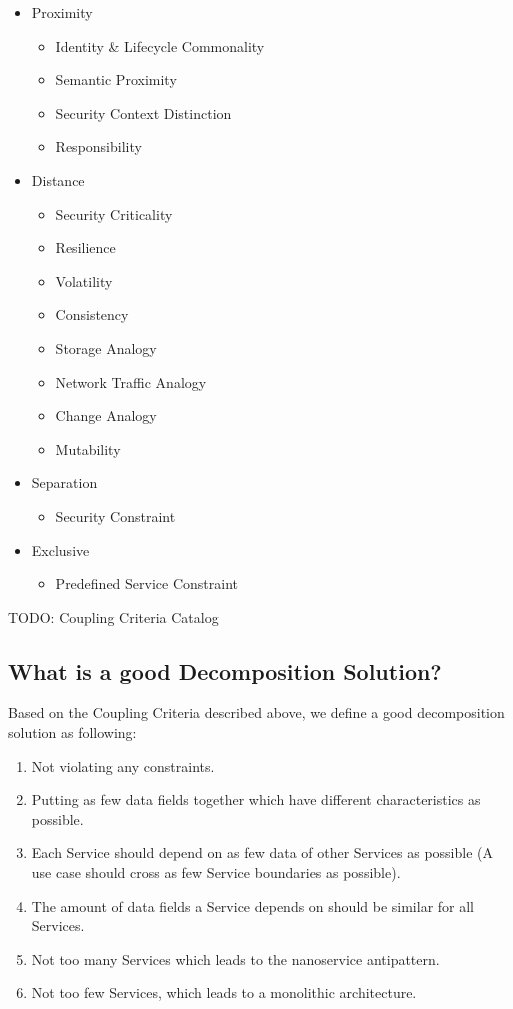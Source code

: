 \begin{itemize}
\item Proximity
	\begin{itemize}
	\item Identity \& Lifecycle Commonality
	\item Semantic Proximity
	\item Security Context Distinction
	\item Responsibility
	\end{itemize}
\item Distance
	\begin{itemize}
	\item Security Criticality
	\item Resilience
	\item Volatility
	\item Consistency
	\item Storage Analogy
	\item Network Traffic Analogy
	\item Change Analogy
	\item Mutability
	\end{itemize}
\item Separation
	\begin{itemize}
	\item Security Constraint
	\end{itemize}
\item Exclusive
	\begin{itemize}
	\item Predefined Service Constraint
	\end{itemize}
\end{itemize}

TODO: Coupling Criteria Catalog


\subsection{What is a good Decomposition Solution?}
\label{sec:decompositionRequirements}

Based on the Coupling Criteria described above, we define a good decomposition solution as following:

\begin{enumerate}
	\item Not violating any constraints.
	\item Putting as few data fields together which have different characteristics as possible.
	\item Each Service should depend on as few data of other Services as possible (A use case should cross as few Service boundaries as possible).
	\item The amount of data fields a Service depends on should be similar for all Services.
	\item Not too many Services which leads to the nanoservice antipattern\cite{nanoservice}.
	\item Not too few Services, which leads to a monolithic architecture.
\end{enumerate}

